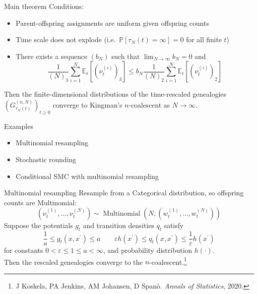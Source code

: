 \documentclass[aspectratio=169]{beamer}
\theoremstyle{definition}
\newcommand{\PR}{\mathbb{P}}
\newcommand{\E}{\mathbb{E}}
\newcommand{\Mn}{\operatorname{Multinomial}}
\newcommand{\vt}[2][t]{\nu_{#1}^{(#2)}}
\newcommand{\wt}[2][t]{w_{#1}^{(#2)}}
\begin{document}
\begin{frame}{Main theorem}
Conditions:
\begin{itemize}
\item Parent-offspring assignments are uniform given offspring counts
\pause
\item Time scale does not explode (i.e.\ $\PR[\tau_N(t)=\infty]=0$ for all finite $t$)
\pause
\item There exists a sequence $(b_N)$ such that $\lim_{N\to\infty} b_N = 0$ and
\begin{equation*}
\frac{1}{(N)_3} \sum_{i=1}^N \E_t [ (\vt{i})_3 ]
\leq b_N \frac{1}{(N)_2} \sum_{i=1}^N \E_t [ (\vt{i})_2 ]
\end{equation*}
\end{itemize}
\pause
Then the finite-dimensional distributions of the time-rescaled genealogies $\left( G_{\tau_N(t)}^{(n,N)} \right)_{t\geq0}$ converge to Kingman's $n$-coalescent as $N\to\infty$.
\end{frame}


\begin{frame}{Examples}
\begin{itemize}
\item Multinomial resampling
\item Stochastic rounding 
\item Conditional SMC with multinomial resampling
\end{itemize}
\end{frame}


\begin{frame}{Multinomial resampling}
Resample from a Categorical distribution, so offspring counts are Multinomial:
\begin{equation*}
(\vt{1} , \dots, \vt{N}) \sim \Mn \left( N, (\wt{1},\dots,\wt{N}) \right)
\end{equation*}
\pause
Suppose the potentials $g_t$ and transition densities $q_t$ satisfy
\begin{equation*}
\frac{1}{a} \leq g_t(x, x^\prime) \leq a \qquad
\varepsilon h(x^\prime) \leq q_t(x, x^\prime) \leq \frac{1}{\varepsilon} h(x^\prime) 
\end{equation*}
for constants $0<\varepsilon\leq 1\leq a<\infty$, and probability distribution $h(\cdot)$.\\[10pt]
\pause
Then the rescaled genealogies converge to the $n$-coalescent.\footnote{J Koskela, PA Jenkins, AM Johansen, D Span\`o. \textit{Annals of Statistics}, 2020.}
\end{frame}
\end{document}
